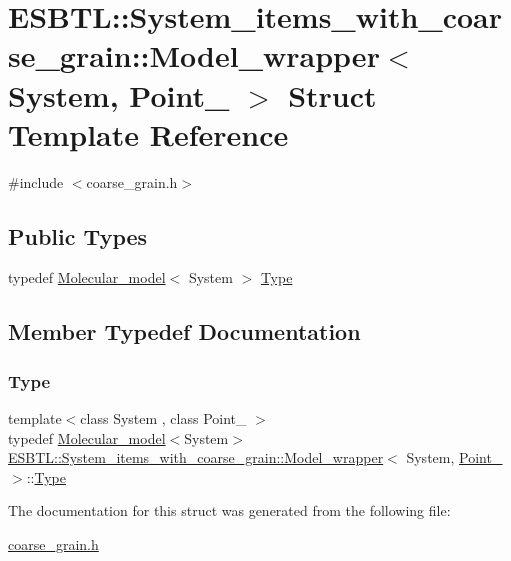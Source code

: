 \hypertarget{structESBTL_1_1System__items__with__coarse__grain_1_1Model__wrapper}{}\section{E\+S\+B\+TL\+:\+:System\+\_\+items\+\_\+with\+\_\+coarse\+\_\+grain\+:\+:Model\+\_\+wrapper$<$ System, Point\+\_ $>$ Struct Template Reference}
\label{structESBTL_1_1System__items__with__coarse__grain_1_1Model__wrapper}


{\ttfamily \#include $<$coarse\+\_\+grain.\+h$>$}

\subsection*{Public Types}
\begin{DoxyCompactItemize}
\item 
typedef \hyperlink{classESBTL_1_1Molecular__model}{Molecular\+\_\+model}$<$ System $>$ \hyperlink{structESBTL_1_1System__items__with__coarse__grain_1_1Model__wrapper_a051912c005f26be4419a9352b3362044}{Type}
\end{DoxyCompactItemize}


\subsection{Member Typedef Documentation}
\mbox{\label{structESBTL_1_1System__items__with__coarse__grain_1_1Model__wrapper_a051912c005f26be4419a9352b3362044}} 
\subsubsection{\texorpdfstring{Type}{Type}}
{\footnotesize\ttfamily template$<$class System , class Point\+\_ $>$ \\
typedef \hyperlink{classESBTL_1_1Molecular__model}{Molecular\+\_\+model}$<$System$>$ \hyperlink{structESBTL_1_1System__items__with__coarse__grain_1_1Model__wrapper}{E\+S\+B\+T\+L\+::\+System\+\_\+items\+\_\+with\+\_\+coarse\+\_\+grain\+::\+Model\+\_\+wrapper}$<$ System, \hyperlink{classESBTL_1_1Point__3}{Point\+\_} $>$\+::\hyperlink{structESBTL_1_1System__items__with__coarse__grain_1_1Model__wrapper_a051912c005f26be4419a9352b3362044}{Type}}



The documentation for this struct was generated from the following file\+:\begin{DoxyCompactItemize}
\item 
\hyperlink{coarse__grain_8h}{coarse\+\_\+grain.\+h}\end{DoxyCompactItemize}
